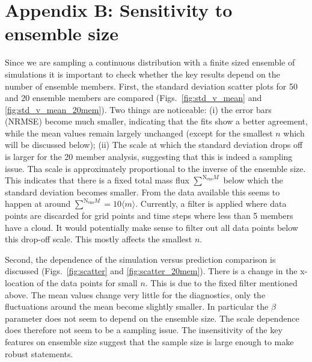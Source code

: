 \documentclass[a4paper, 12pt]{article}
\begin{document}
\section{Appendix B: Sensitivity to ensemble size}
Since we are sampling a continuous distribution with a finite sized ensemble of simulations it is important to check whether the key results depend on the number of ensemble members. First, the standard deviation scatter plots for 50 and 20 ensemble members are compared (Figs.~\ref{fig:std_v_mean} and \ref{fig:std_v_mean_20mem}). Two things are noticeable: (i) the error bars (NRMSE) become much smaller, indicating that the fits show a better agreement, while the mean values remain largely unchanged (except for the smallest $n$ which will be discussed below); (ii) The scale at which the standard deviation drops off is larger for the 20 member analysis, suggesting that this is indeed a sampling issue. Tha scale is approximately proportional to the inverse of the ensemble size. This indicates that there is a fixed total mass flux $\sum^{\mathrm{N_{ens}}M}$ below which the standard deviation becomes smaller. From the data available this seems to happen at around $\sum^{\mathrm{N_{ens}}M} = 10 \langle m \rangle$. Currently, a filter is applied where data points are discarded for grid points and time steps where less than 5 members have a cloud. It would potentially make sense to filter out all data points below this drop-off scale. This mostly affects the smallest $n$.

Second, the dependence of the simulation versus prediction comparison is discussed (Figs.~\ref{fig:scatter} and \ref{fig:scatter_20mem}). There is a change in the x-location of the data points for small $n$. This is due to the fixed filter mentioned above. The mean values change very little for the diagnostics, only the fluctuations around the mean become slightly smaller. In particular the $\beta$ parameter does not seem to depend on the ensemble size. The scale dependence does therefore not seem to be a sampling issue. The insensitivity of the key features on ensemble size suggest that the sample size is large enough to make robust statements. 
\end{document}
